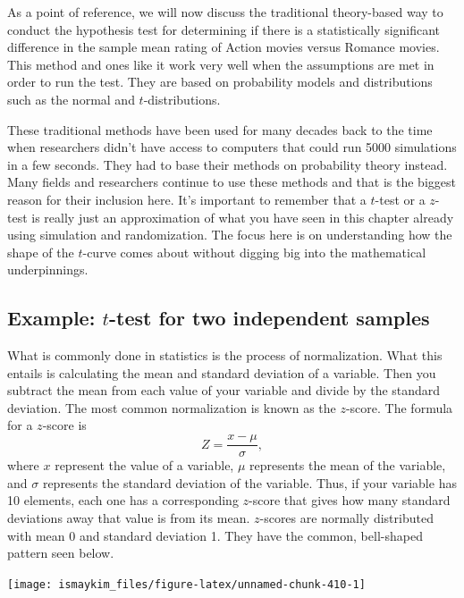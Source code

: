 \documentclass[12pt,]{krantz}
\theoremstyle{definition}
\theoremstyle{definition}
\theoremstyle{definition}
\theoremstyle{remark}
\begin{document}
As a point of reference, we will now discuss the traditional
theory-based way to conduct the hypothesis test for determining if there
is a statistically significant difference in the sample mean rating of
Action movies versus Romance movies. This method and ones like it work
very well when the assumptions are met in order to run the test. They
are based on probability models and distributions such as the normal and
\(t\)-distributions.

These traditional methods have been used for many decades back to the
time when researchers didn't have access to computers that could run
5000 simulations in a few seconds. They had to base their methods on
probability theory instead. Many fields and researchers continue to use
these methods and that is the biggest reason for their inclusion here.
It's important to remember that a \(t\)-test or a \(z\)-test is really
just an approximation of what you have seen in this chapter already
using simulation and randomization. The focus here is on understanding
how the shape of the \(t\)-curve comes about without digging big into
the mathematical underpinnings.

\subsection{\texorpdfstring{Example: \(t\)-test for two independent
samples}{Example: t-test for two independent samples}}\label{example-t-test-for-two-independent-samples}

What is commonly done in statistics is the process of normalization.
What this entails is calculating the mean and standard deviation of a
variable. Then you subtract the mean from each value of your variable
and divide by the standard deviation. The most common normalization is
known as the \(z\)-score. The formula for a \(z\)-score is
\[Z = \frac{x - \mu}{\sigma},\] where \(x\) represent the value of a
variable, \(\mu\) represents the mean of the variable, and \(\sigma\)
represents the standard deviation of the variable. Thus, if your
variable has 10 elements, each one has a corresponding \(z\)-score that
gives how many standard deviations away that value is from its mean.
\(z\)-scores are normally distributed with mean 0 and standard deviation
1. They have the common, bell-shaped pattern seen below.

\begin{center}\texttt{[image: ismaykim\_files/figure-latex/unnamed-chunk-410-1]} \end{center}
\end{document}
